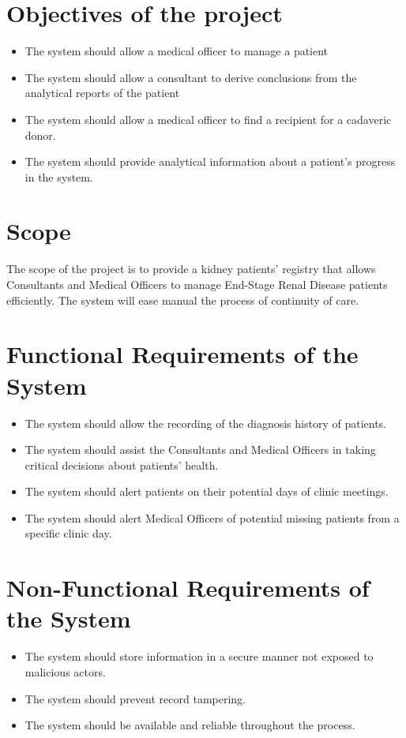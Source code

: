 \documentclass[12pt,a4paper]{report}
\begin{document}
\section{Objectives of the project}

\begin{itemize}
\item The system should allow a medical officer to manage a patient 
\item The system should allow a consultant to derive conclusions from the analytical reports of the patient
\item The system should allow a medical officer to find a recipient for a cadaveric donor. 
\item The system should provide analytical information about a patient’s progress in the system. 
	
\end{itemize}


\section{Scope}
The scope of the project is to provide a kidney patients’ registry that allows Consultants and Medical Officers to manage End-Stage Renal Disease patients efficiently. The system will ease manual the process of continuity of care. 

\section{Functional Requirements of the System}

\begin{itemize}
\item The system should allow the recording of the diagnosis history of patients. 
\item The system should assist the Consultants and Medical Officers in taking critical decisions about patients’ health. 
\item The system should alert patients on their potential days of clinic meetings.
\item The system should alert Medical Officers of potential missing patients from a specific clinic day.

\end{itemize}

\section{Non-Functional Requirements of the System}
\begin{itemize}

\item The system should store information in a secure manner not exposed to malicious actors.
\item The system should prevent record tampering. 
\item The system should be available and reliable throughout the process. 
	
\end{itemize}
\end{document}
